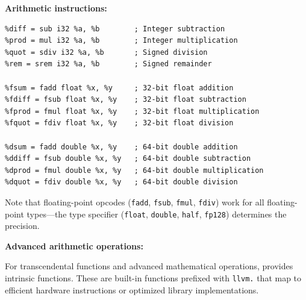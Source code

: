 \textbf{Arithmetic instructions:}

\begin{lstlisting}[style=ir]
%sum = add i32 %a, %b         ; Integer addition
%diff = sub i32 %a, %b        ; Integer subtraction
%prod = mul i32 %a, %b        ; Integer multiplication
%quot = sdiv i32 %a, %b       ; Signed division
%rem = srem i32 %a, %b        ; Signed remainder

%fsum = fadd float %x, %y     ; 32-bit float addition
%fdiff = fsub float %x, %y    ; 32-bit float subtraction
%fprod = fmul float %x, %y    ; 32-bit float multiplication
%fquot = fdiv float %x, %y    ; 32-bit float division

%dsum = fadd double %x, %y    ; 64-bit double addition
%ddiff = fsub double %x, %y   ; 64-bit double subtraction
%dprod = fmul double %x, %y   ; 64-bit double multiplication
%dquot = fdiv double %x, %y   ; 64-bit double division
\end{lstlisting}

Note that floating-point opcodes (\texttt{fadd}, \texttt{fsub}, \texttt{fmul}, \texttt{fdiv}) work for all floating-point types---the type specifier (\texttt{float}, \texttt{double}, \texttt{half}, \texttt{fp128}) determines the precision.

\textbf{Advanced arithmetic operations:}

For transcendental functions and advanced mathematical operations,  provides intrinsic functions. These are built-in functions prefixed with \texttt{llvm.} that map to efficient hardware instructions or optimized library implementations.

